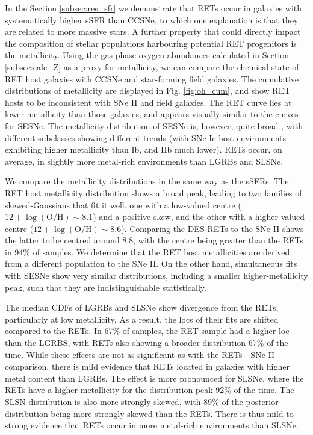 \documentclass[fleqn,usenatbib,]{mnras}
\newcommand{\replychris}[1]{\color{magenta}#1 \color{black}}
\newcommand{\replylluis}[1]{\color{green}#1 \color{black}}
\begin{document}
In the Section \ref{subsec:res_sfr} we demonstrate that RETs occur in galaxies with systematically higher sSFR than CCSNe, to which one explanation is that they are related to more massive stars. A further property that could directly impact the composition of stellar populations harbouring potential RET progenitors is the metallicity. Using the gas-phase oxygen abundances calculated in Section \ref{subsec:calc_Z} as a proxy for metallicity, we can compare the chemical state of RET host galaxies with CCSNe and star-forming field galaxies. The cumulative distributions of metallicity are displayed in Fig. \ref{fig:oh_cum}, and show RET hosts to be inconsistent with SNe II and field galaxies. The RET curve lies at lower metallicity than those galaxies, and appears visually similar to the curves for SESNe. \replylluis{The metallicity distribution of SESNe is, however, quite broad \citep[e.g.][]{Anderson2010}, with different subclasses showing different trends (with SNe Ic host environments exhibiting higher metallicity than Ib, and IIb much lower).} RETs occur, on average, in slightly more metal-rich environments than LGRBs and SLSNe.

We compare the metallicity distributions in the same way as the sSFRs. The RET host metallicity distribution shows a broad peak, leading to two families of skewed-Gaussians that fit it well, one with a low-valued centre  ($12 + \log \mathrm{(O/H)} \sim 8.1$) and a positive skew, and the other with a higher-valued centre ($12 + \log \mathrm{(O/H)} \sim 8.6$). Comparing the DES RETs to the \citet{Stoll2013} SNe II shows the latter to be centred around 8.8, with the centre being greater than the RETs in 94\% of samples. We determine that the RET host metallicities are derived from a different population to the SNe II. On the other hand, simultaneous fits with SESNe show very similar distributions, including a smaller higher-metallicity peak, such that they are indistinguishable statistically. 

The median CDFs of LGRBs and SLSNe show divergence from the RETs, particularly at low metallicity. As a result, the \replychris{locs} of their fits are shifted compared to the RETs. In 67\% of samples, the RET sample had a higher \replychris{loc} than the LGRBS, with RETs also showing a broader distribution 67\% of the time. While these effects are not as significant as with the RETs - SNe II comparison, there is mild evidence that RETs located in galaxies with higher metal content than LGRBs. The effect is more pronounced for SLSNe, where the RETs have a higher metallicity for the distribution peak 92\% of the time. The SLSN distribution is also more strongly skewed, with 89\% of the posterior distribution being more strongly skewed than the RETs. There is thus mild-to-strong evidence that RETs occur in more metal-rich environments than SLSNe. 
\end{document}
